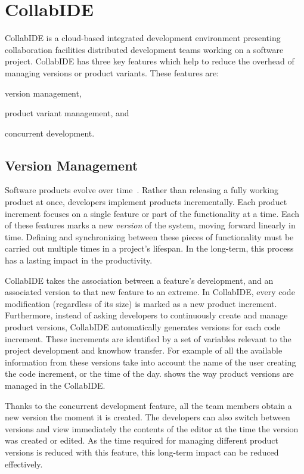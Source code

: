 
\section{CollabIDE}
\label{sec:collab-ide}

CollabIDE is a cloud-based integrated development environment presenting collaboration facilities 
distributed development teams working on a software project. CollabIDE has three key features which 
help to reduce the overhead of managing versions or product variants. These features are:
\begin{enumerate*}[label=(\arabic*)] 
\item version management, 
\item product variant management, and 
\item concurrent development.
\end{enumerate*}

\subsection{Version Management}
Software products evolve over time~\cite{lehman02}. Rather than releasing a fully working product at once, developers implement products incrementally. Each product increment focuses on a single feature or part of the functionality at a time. Each of these features marks a new \emph{version} of the system, moving forward linearly in time. Defining and synchronizing between these pieces of functionality must be carried out multiple times in a project's lifespan. In the long-term, this process has a lasting impact in the productivity.

CollabIDE takes the association between a feature's development, and an associated version to that 
new feature to an extreme. In CollabIDE, every code modification (regardless of its size) is marked as 
a new product increment.
Furthermore, instead of asking developers to continuously create and manage product versions, 
CollabIDE automatically generates versions for each code increment. These increments are identified 
by a set of variables relevant to the project development and knowhow transfer. For example of all the  
available information from these versions take into account the name of the user creating the code 
increment, or the time of the day.
 shows the way product versions are managed in the CollabIDE. 

Thanks to the concurrent development feature, all the team members obtain a new version the moment it is created. The developers can also switch between versions and view immediately the contents of the editor at the time the version was created or edited. 
As the time required for managing different product versions is reduced with this feature, this long-term impact can be reduced effectively.

